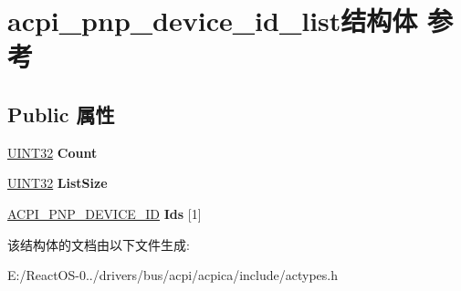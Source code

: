 \hypertarget{structacpi__pnp__device__id__list}{}\section{acpi\+\_\+pnp\+\_\+device\+\_\+id\+\_\+list结构体 参考}
\label{structacpi__pnp__device__id__list}
\subsection*{Public 属性}
\begin{DoxyCompactItemize}
\item 
\mbox{\label{structacpi__pnp__device__id__list_ab0c0894b3bfacf367f7fb50337bd1eb4}} 
\hyperlink{_processor_bind_8h_ae1e6edbbc26d6fbc71a90190d0266018}{U\+I\+N\+T32} {\bfseries Count}
\item 
\mbox{\label{structacpi__pnp__device__id__list_ada2ff5cf9a61605698edf3bd855b5ac2}} 
\hyperlink{_processor_bind_8h_ae1e6edbbc26d6fbc71a90190d0266018}{U\+I\+N\+T32} {\bfseries List\+Size}
\item 
\mbox{\label{structacpi__pnp__device__id__list_ad40ba0b127d2c478979e793e5d08d496}} 
\hyperlink{structacpi__pnp__device__id}{A\+C\+P\+I\+\_\+\+P\+N\+P\+\_\+\+D\+E\+V\+I\+C\+E\+\_\+\+ID} {\bfseries Ids} \mbox{[}1\mbox{]}
\end{DoxyCompactItemize}


该结构体的文档由以下文件生成\+:\begin{DoxyCompactItemize}
\item 
E\+:/\+React\+O\+S-\/0../drivers/bus/acpi/acpica/include/actypes.\+h\end{DoxyCompactItemize}
